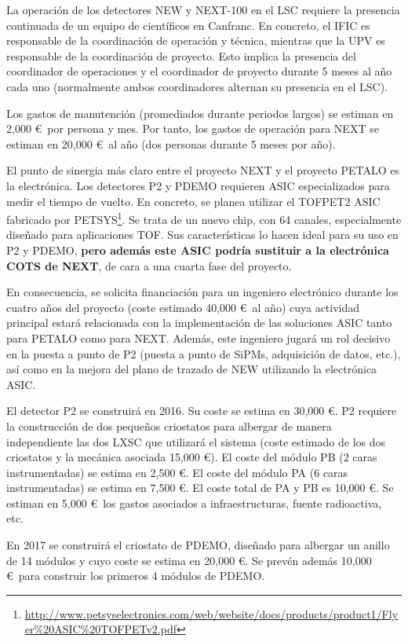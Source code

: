La operación de los detectores NEW y NEXT-100 en el LSC requiere la presencia continuada de un equipo de científicos en Canfranc. En concreto, el IFIC es responsable de la coordinación de operación y técnica, mientras que la UPV es responsable de la coordinación de proyecto. Esto implica la presencia del coordinador de operaciones y el coordinador de proyecto durante 5 meses al año cada uno (normalmente ambos coordinadores alternan su presencia en el LSC). 

Los gastos de manutención (promediados durante periodos largos) se estiman en 2,000 \euro\ por persona y mes. Por tanto, los gastos de operación para NEXT se estiman en 20,000 \euro\  al año (dos personas durante 5 meses por año). 

El punto de sinergia más claro entre el proyecto NEXT y el proyecto PETALO es la electrónica. Los detectores P2 y PDEMO requieren ASIC especializados para medir el tiempo de vuelto. En concreto, se planea utilizar el 
TOFPET2 ASIC fabricado por PETSYS\footnote{\url{http://www.petsyselectronics.com/web/website/docs/products/product1/Flyer\%20ASIC\%20TOFPETv2.pdf}}. Se trata de un nuevo chip, con 64 canales, especialmente diseñado para aplicaciones TOF. Sus características lo hacen ideal para su uso en P2 y PDEMO, {\bf pero además este ASIC podría sustituir a la electrónica COTS de NEXT}, de cara a una cuarta fase del proyecto. 

En consecuencia, se solicita financiación para un ingeniero electrónico durante los cuatro años del proyecto (coste estimado 40,000 \euro\  al año) cuya actividad principal estará relacionada con la implementación de las soluciones ASIC tanto para PETALO como para NEXT. Además, este ingeniero jugará un rol decisivo en la puesta a punto de P2 (puesta a punto de SiPMs, adquisición de datos, etc.), así como en la mejora del plano de trazado de NEW utilizando la electrónica ASIC. 

El detector P2 se construirá en 2016. Su coste se estima en 30,000 \euro. P2 requiere la construcción de dos pequeños criostatos para albergar de manera independiente las dos LXSC que utilizará el sistema (coste estimado de los dos criostatos y la mecánica asociada 15,000 \euro). El coste del módulo PB (2 caras instrumentadas) se estima en 2,500 \euro. El coste del módulo PA (6 caras instrumentadas) se estima en 7,500 \euro. El coste total de PA y PB es 10,000 \euro. Se estiman en 5,000 \euro\ los gastos asociados a infraestructuras, fuente radioactiva, etc. 

En 2017 se construirá el criostato de PDEMO, diseñado para albergar un anillo de 14 módulos y cuyo coste se estima en 20,000 \euro. Se prevén además 10,000 \euro\ para construir los primeros 4 módulos de PDEMO.


